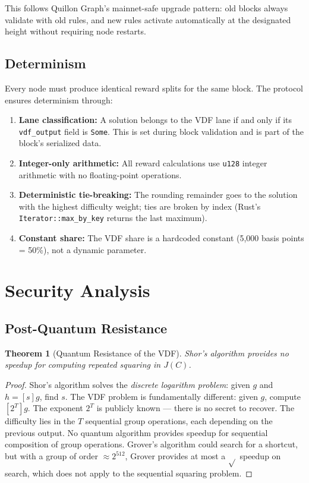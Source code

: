 \documentclass[11pt,a4paper]{article}
\newtheorem{theorem}{Theorem}[section]
\begin{document}
This follows Quillon Graph's mainnet-safe upgrade pattern: old blocks always validate with old rules, and new rules activate automatically at the designated height without requiring node restarts.

\subsection{Determinism}

Every node must produce identical reward splits for the same block. The protocol ensures determinism through:

\begin{enumerate}
    \item \textbf{Lane classification:} A solution belongs to the VDF lane if and only if its \texttt{vdf\_output} field is \texttt{Some}. This is set during block validation and is part of the block's serialized data.
    \item \textbf{Integer-only arithmetic:} All reward calculations use \texttt{u128} integer arithmetic with no floating-point operations.
    \item \textbf{Deterministic tie-breaking:} The rounding remainder goes to the solution with the highest difficulty weight; ties are broken by index (Rust's \texttt{Iterator::max\_by\_key} returns the last maximum).
    \item \textbf{Constant share:} The VDF share is a hardcoded constant (5,000 basis points = 50\%), not a dynamic parameter.
\end{enumerate}

\section{Security Analysis}
\label{sec:security}

\subsection{Post-Quantum Resistance}

\begin{theorem}[Quantum Resistance of the VDF]
\label{thm:quantum}
Shor's algorithm provides no speedup for computing repeated squaring in $J(C)$.
\end{theorem}

\begin{proof}
Shor's algorithm solves the \emph{discrete logarithm problem}: given $g$ and $h = [s]g$, find $s$. The VDF problem is fundamentally different: given $g$, compute $[2^T]g$. The exponent $2^T$ is publicly known --- there is no secret to recover. The difficulty lies in the $T$ sequential group operations, each depending on the previous output. No quantum algorithm provides speedup for sequential composition of group operations. Grover's algorithm could search for a shortcut, but with a group of order $\approx 2^{512}$, Grover provides at most a $\sqrt{}$ speedup on search, which does not apply to the sequential squaring problem.
\end{proof}
\end{document}
